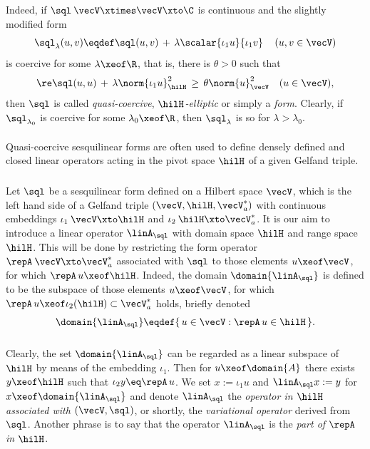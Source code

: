 \documentclass[11pt,twoside]{article}
\begin{document}
\subparagraph{}
Indeed,
if $\sql\:\vecV \xtimes \vecV \xto \C$ is continuous
and the slightly modified form
\[
\sql_{\lambda}(u,v) \eqdef
\sql(u,v) \, + \, \lambda \scalar{\iota_1 u}{\iota_1 v}\, \quad
(u,v \in \vecV)
\]
is coercive for some $\lambda \xeof \R$,
that is,
there is $\theta > 0$ such that
\begin{equation}\label{XI_QUASI_COERCIVE}
\re \sql(u,u)  \, + \,
\lambda \norm{\iota_1u}_{\hilH}^2 \, \geq \, \theta \norm{u}_{\vecV}^2
\quad (u \in \vecV),
\end{equation}
then $\sql$ is called
\textit{quasi-coercive},
\textit{$\hilH$-elliptic}
or simply a \textit{\GARDING} \textit{form}.
Clearly,
if $\sql_{\lambda_0}$ is coercive for some $\lambda_0 \xeof \R$,
then $\sql_{\lambda}$ is so for $\lambda > \lambda_0$.

\paragraph{} %
Quasi-coercive sesquilinear forms are often used
to define densely defined and closed linear operators
acting in the pivot space $\hilH$ of a given Gelfand triple.

\subparagraph{}
Let $\sql$ be a sesquilinear form defined on a Hilbert space $\vecV$,
which is the left hand side of a Gelfand triple $(\vecV,\hilH,\vecV_a^*)$
with continuous embeddings
$\iota_1\:\vecV \xto \hilH$ and
$\iota_2\:\hilH \xto \vecV_a^*$.
It is our aim to introduce a linear operator $\linA_{\sql}$
with domain space $\hilH$ and range space $\hilH$.
This will be done by restricting the form operator
$\repA\:\vecV \xto \vecV_a^*$ associated with $\sql$
to those elements $u \xeof \vecV$,
for which $\repA \, u \xeof \hilH$.
Indeed,
the domain $\domain{\linA_{\sql}}$ is defined to be the subspace
of those elements $u \xeof \vecV$,
for which $\repA \, u \xeof \iota_2(\hilH) \subset \vecV_a^*$ holds,
briefly denoted
\[
\domain{\linA_{\sql}} \eqdef \{ \, u \in \vecV: \repA \, u \in \hilH \, \}.
\]

\subparagraph{}
Clearly,
the set $\domain{\linA_{\sql}}$ can be regarded as a linear subspace
of $\hilH$ by means of the embedding $\iota_1$.
Then for $u \xeof \domain{A}$ there exists $y \xeof \hilH$
such that $\iota_2 y \eq \repA \, u$.
We set $x := \iota_1 u$ and $\linA_{\sql} x := y$
for $x \xeof \domain{\linA_{\sql}}$
and denote $\linA_{\sql}$
the \textit{operator in $\hilH$ associated with $(\vecV,\sql)$},
or shortly,
the \textit{variational operator} derived from $\sql$.
Another phrase is to say that
the operator $\linA_{\sql}$ is the \textit{part of $\repA$ in $\hilH$}.
\end{document}
